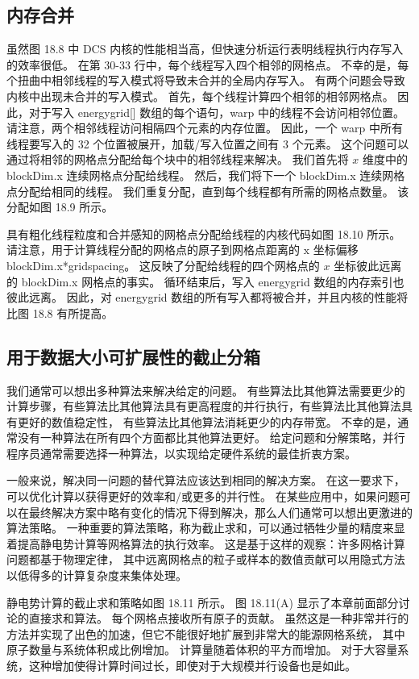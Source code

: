 \subsection{内存合并}
虽然图 18.8 中 DCS 内核的性能相当高，但快速分析运行表明线程执行内存写入的效率很低。 
在第 30-33 行中，每个线程写入四个相邻的网格点。 不幸的是，每个扭曲中相邻线程的写入模式将导致未合并的全局内存写入。 
有两个问题会导致内核中出现未合并的写入模式。 首先，每个线程计算四个相邻的相邻网格点。 
因此，对于写入 energygrid[] 数组的每个语句，warp 中的线程不会访问相邻位置。 
请注意，两个相邻线程访问相隔四个元素的内存位置。 
因此，一个 warp 中所有线程要写入的 32 个位置被展开，加载/写入位置之间有 3 个元素。 
这个问题可以通过将相邻的网格点分配给每个块中的相邻线程来解决。 
我们首先将 $x$ 维度中的 blockDim.x 连续网格点分配给线程。 
然后，我们将下一个 blockDim.x 连续网格点分配给相同的线程。 
我们重复分配，直到每个线程都有所需的网格点数量。 该分配如图 18.9 所示。

具有粗化线程粒度和合并感知的网格点分配给线程的内核代码如图 18.10 所示。 
请注意，用于计算线程分配的网格点的原子到网格点距离的 $\mathrm{x}$ 坐标偏移 blockDim.x*gridspacing。 
这反映了分配给线程的四个网格点的 $x$ 坐标彼此远离的 blockDim.x 网格点的事实。 
循环结束后，写入 energygrid 数组的内存索引也彼此远离。 
因此，对 energygrid 数组的所有写入都将被合并，并且内核的性能将比图 18.8 有所提高。

\subsection{用于数据大小可扩展性的截止分箱}
我们通常可以想出多种算法来解决给定的问题。 
有些算法比其他算法需要更少的计算步骤，有些算法比其他算法具有更高程度的并行执行，有些算法比其他算法具有更好的数值稳定性，
有些算法比其他算法消耗更少的内存带宽。 不幸的是，通常没有一种算法在所有四个方面都比其他算法更好。 
给定问题和分解策略，并行程序员通常需要选择一种算法，以实现给定硬件系统的最佳折衷方案。

一般来说，解决同一问题的替代算法应该达到相同的解决方案。 在这一要求下，可以优化计算以获得更好的效率和/或更多的并行性。 
在某些应用中，如果问题可以在最终解决方案中略有变化的情况下得到解决，那么人们通常可以想出更激进的算法策略。 
一种重要的算法策略，称为截止求和，可以通过牺牲少量的精度来显着提高静电势计算等网格算法的执行效率。 
这是基于这样的观察：许多网格计算问题都基于物理定律，
其中远离网格点的粒子或样本的数值贡献可以用隐式方法以低得多的计算复杂度来集体处理。

静电势计算的截止求和策略如图 18.11 所示。 图 18.11(A) 显示了本章前面部分讨论的直接求和算法。 
每个网格点接收所有原子的贡献。 虽然这是一种非常并行的方法并实现了出色的加速，但它不能很好地扩展到非常大的能源网格系统，
其中原子数量与系统体积成比例增加。 计算量随着体积的平方而增加。 
对于大容量系统，这种增加使得计算时间过长，即使对于大规模并行设备也是如此。

